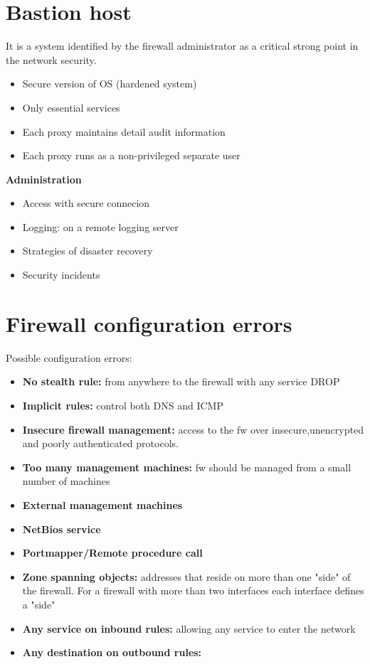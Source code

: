 \documentclass[10pt,a4paper]{book}
\begin{document}
\section{Bastion host}
It is a system identified by the firewall administrator as a critical strong point in the network security.
\begin{itemize}
\item Secure version of OS (hardened system)
\item Only essential services
\item Each proxy maintains detail audit information
\item Each proxy runs as a non-privileged separate user
\end{itemize}
\textbf{Administration}
\begin{itemize}
\item Access with secure connecion
\item Logging: on a remote logging server
\item Strategies of disaster recovery
\item Security incidents
\end{itemize}
\newpage
\section{Firewall configuration errors}
Possible configuration errors:
\begin{itemize}
\item \textbf{No stealth rule:} from anywhere to the firewall with any service DROP
\item \textbf{Implicit rules:} control both DNS and ICMP
\item \textbf{Insecure firewall management:} access to the fw over insecure,unencrypted and poorly authenticated protocols.
\item \textbf{Too many management machines:} fw should be managed from a small number of machines
\item \textbf{External management machines}
\item \textbf{NetBios service}
\item \textbf{Portmapper/Remote procedure call}
\item \textbf{Zone spanning objects:} addresses that reside on more than one "side" of the firewall. For a firewall with more than two interfaces each interface defines a "side"
\item \textbf{Any service on inbound rules:} allowing any service to enter the network
\item \textbf{Any destination on outbound rules:} 
\end{itemize}
\end{document}
